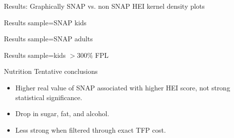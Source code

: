 \documentclass{beamer}
\begin{document}
\begin{frame}{Results: Graphically}
SNAP vs. non SNAP HEI kernel density plots
\end{frame}

\begin{frame}{Results}
sample=SNAP kids
\end{frame}

\begin{frame}{Results}
sample=SNAP adults
\end{frame}

\begin{frame}{Results}
sample=kids $> 300\%$ FPL
\end{frame}

\begin{frame}{Nutrition}
Tentative conclusions
 
\begin{itemize}
\item Higher real value of SNAP associated with higher HEI score, not strong statistical significance.
\item Drop in sugar, fat, and alcohol.
\item Less strong when filtered through exact TFP cost.
\end{itemize}
\end{frame}
\begin{frame}[plain]
\hspace{34mm}
\end{frame}
\end{document}
